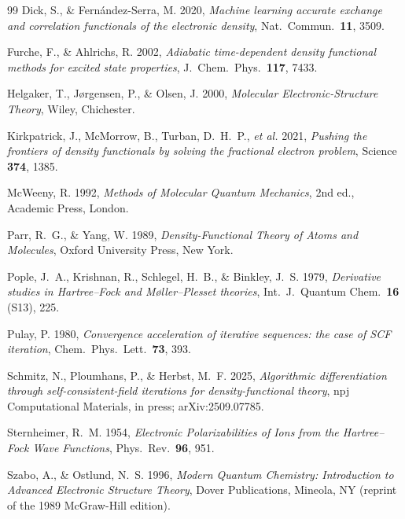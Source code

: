 \documentclass[11pt]{article}
\begin{document}
\begin{thebibliography}{99}
Dick, S., \& Fern\'andez-Serra, M. 2020, \emph{Machine learning
accurate exchange and correlation functionals of the electronic
density}, Nat.\ Commun.\ \textbf{11}, 3509.

Furche, F., \& Ahlrichs, R. 2002, \emph{Adiabatic time-dependent
density functional methods for excited state properties},
J.\ Chem.\ Phys.\ \textbf{117}, 7433.

Helgaker, T., J\o rgensen, P., \& Olsen, J. 2000, \emph{Molecular
Electronic-Structure Theory}, Wiley, Chichester.

Kirkpatrick, J., McMorrow, B., Turban, D.~H.~P., \emph{et al.}
2021, \emph{Pushing the frontiers of density functionals by solving
the fractional electron problem}, Science \textbf{374}, 1385.

McWeeny, R. 1992, \emph{Methods of Molecular Quantum Mechanics},
2nd ed., Academic Press, London.

Parr, R.~G., \& Yang, W. 1989, \emph{Density-Functional Theory of
Atoms and Molecules}, Oxford University Press, New York.

Pople, J.~A., Krishnan, R., Schlegel, H.~B., \& Binkley, J.~S. 1979,
\emph{Derivative studies in Hartree--Fock and M\o ller--Plesset
theories}, Int.\ J.\ Quantum Chem.\ \textbf{16} (S13), 225.

Pulay, P. 1980, \emph{Convergence acceleration of iterative sequences:
the case of SCF iteration}, Chem.\ Phys.\ Lett.\ \textbf{73}, 393.

Schmitz, N., Ploumhans, P., \& Herbst, M.~F. 2025,
\emph{Algorithmic differentiation through self-consistent-field
iterations for density-functional theory}, npj Computational
Materials, in press; arXiv:2509.07785.

Sternheimer, R.~M. 1954, \emph{Electronic Polarizabilities of Ions
from the Hartree--Fock Wave Functions}, Phys.\ Rev.\ \textbf{96}, 951.

Szabo, A., \& Ostlund, N.~S. 1996, \emph{Modern Quantum Chemistry:
Introduction to Advanced Electronic Structure Theory}, Dover
Publications, Mineola, NY (reprint of the 1989 McGraw-Hill edition).

\end{thebibliography}
\end{document}

